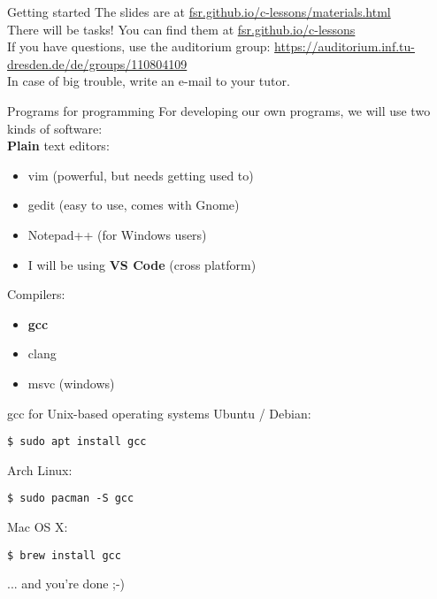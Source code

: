 \begin{frame}{Getting started}
	The slides are at \href{https://fsr.github.io/c-lessons/materials.html}{fsr.github.io/c-lessons/materials.html}\\
	\bigskip
	There will be tasks! You can find them at \href{http://fsr.github.io/c-lessons/}{fsr.github.io/c-lessons}\\
	\bigskip
	If you have questions, use the auditorium group: \href{https://auditorium.inf.tu-dresden.de/de/groups/110804109}{https://auditorium.inf.tu-dresden.de/de/groups/110804109}\\
	\bigskip
	In case of big trouble, write an e-mail to your tutor.\\
\end{frame}

\begin{frame}{Programs for programming}
	For developing our own programs, we will use two kinds of software:\\
	\bigskip
	\textbf{Plain} text editors:
	\begin{itemize}
		\item vim (powerful, but needs getting used to)
		\item gedit (easy to use, comes with Gnome)
		\item Notepad++ (for Windows users)
		\bigskip
		\item I will be using \textbf{VS Code} (cross platform)
	\end{itemize}
	\bigskip
	Compilers:
	\begin{itemize}
		\item \textbf{gcc}
		\item clang
		\item msvc (windows)
	\end{itemize}
\end{frame}

\begin{frame}[fragile]{gcc for Unix-based operating systems}
	Ubuntu / Debian:
	\begin{lstlisting}[numbers=none]
$ sudo apt install gcc
\end{lstlisting}
	\bigskip
	Arch Linux:
	\begin{lstlisting}[numbers=none]
$ sudo pacman -S gcc
\end{lstlisting}
	\bigskip
	Mac OS X:
	\begin{lstlisting}[numbers=none]
$ brew install gcc
\end{lstlisting}
	\bigskip
	... and you're done ;-)
\end{frame}

